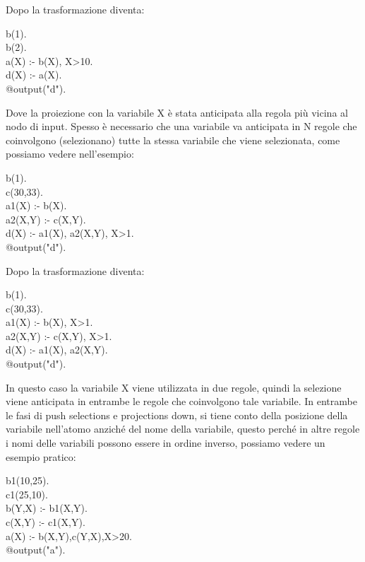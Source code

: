 Dopo la trasformazione diventa: 

\begin{algorithm}[h]
	b(1). \\
	b(2). \\
	a(X) :- b(X), X>10. \\
	d(X) :- a(X). \\
	@output("d"). 
\end{algorithm}
Dove la proiezione con la variabile X è stata anticipata alla regola più vicina al nodo di input. \newline
Spesso è necessario che una variabile va anticipata in N regole che coinvolgono (selezionano) tutte la stessa variabile che viene selezionata, come possiamo vedere nell'esempio: 

\begin{algorithm}[h]
	b(1). \\
	c(30,33). \\
	a1(X) :- b(X). \\
	a2(X,Y) :- c(X,Y). \\
	d(X) :- a1(X), a2(X,Y), X>1. \\
	@output("d").
\end{algorithm}

Dopo la trasformazione diventa: 

\begin{algorithm}[h]
	b(1). \\
	c(30,33). \\
	a1(X) :- b(X), X>1. \\
	a2(X,Y) :- c(X,Y), X>1. \\
	d(X) :- a1(X), a2(X,Y). \\
	@output("d").
\end{algorithm} 

In questo caso la variabile X viene utilizzata in due regole, quindi la selezione viene anticipata in entrambe le regole che coinvolgono tale variabile. \newline
In entrambe le fasi di push selections e projections down, si tiene conto della posizione della variabile nell'atomo anziché del nome della variabile, questo perché in altre regole i nomi delle variabili possono essere in ordine inverso, possiamo vedere un esempio pratico:

\begin{algorithm}[h]
	b1(10,25). \\
	c1(25,10). \\
	b(Y,X) :- b1(X,Y). \\
	c(X,Y) :- c1(X,Y). \\
	a(X) :- b(X,Y),c(Y,X),X>20. \\
	@output("a").
\end{algorithm}

